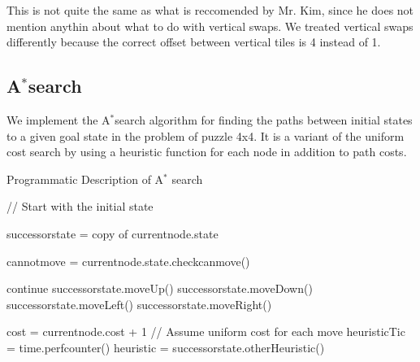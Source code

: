\documentclass{article}
\begin{document}
This is not quite the same as what is reccomended by Mr. Kim, since he does not mention anythin about what to do with vertical swaps. We treated vertical swaps differently because the correct offset between vertical tiles is 4 instead of 1. 

\subsection{A$^*$search}
We implement the A$^*$search algorithm for finding the paths between initial states to a given goal state in the problem of puzzle 4x4. It is a variant of the uniform cost search by using a heuristic function for each node in addition to path costs.
\begin{algorithm}[h]
  
  \caption{Programmatic Description of A$^*$ search}
   \begin{algorithmic}
     // Start with the initial state
        
    
    \EndIf


            \State successorstate = copy of currentnode.state
            
            \State cannotmove = currentnode.state.checkcanmove()
            
            \State continue
            \EndIf
            \State successorstate.moveUp()
            \EndIf
            \State successorstate.moveDown()
            \EndIf
            \State successorstate.moveLeft()
            \EndIf
            \State successorstate.moveRight()
            \EndIf

            \State cost = currentnode.cost + 1  // Assume uniform cost for each move
            \State heuristicTic = time.perfcounter()
            \State heuristic = successorstate.otherHeuristic()
           

\end{algorithmic}
\end{algorithm}
\end{document}
